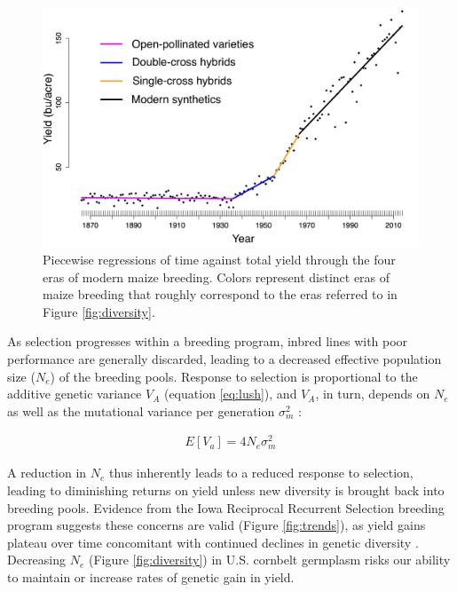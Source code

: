 \documentclass[12pt]{article}
\begin{document}
\begin{figure}
\centering
\includegraphics[width=0.7\linewidth]{yield.png}
\caption{Piecewise regressions of time against total yield through the four eras of modern maize breeding. Colors represent distinct eras of maize breeding that roughly correspond to the eras  referred to in Figure \ref{fig:diversity}.} 
\label{fig:piecewise}
\end{figure}

As selection progresses within a breeding program, inbred lines with poor performance are generally discarded, leading to a decreased effective population size ($N_e$) of the breeding pools.
Response to selection is proportional to the additive genetic variance $V_A$ (equation \ref{eq:lush}), and $V_A$, in turn, depends on $N_e$ as well as the mutational variance per generation ${\sigma}_m^2$ \citep{whitlock1999neutral}:

\begin{align}
E[V_a] = 4N_e {\sigma}_m^2
\label{eq:whitlock}
\end{align}

A reduction in $N_e$ thus inherently leads to a reduced response to selection, leading to diminishing returns on yield unless new diversity is brought back into breeding pools.
Evidence from the Iowa Reciprocal Recurrent Selection breeding program suggests these concerns are valid (Figure \ref{fig:trends}), as yield gains plateau over time \citep{rouse2003selection} concomitant with continued declines in genetic diversity \citep{Gerke:2013tw}.
Decreasing $N_e$ (Figure \ref{fig:diversity}) in U.S. cornbelt germplasm risks our ability to maintain or increase rates of genetic gain in yield.
\end{document}
